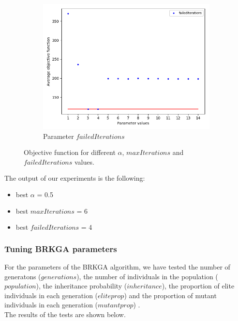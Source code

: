 \begin{figure}
\begin{subfigure}[b]{.49\linewidth}
\includegraphics[width=\linewidth]{./img/best-lsiteration.png}
\caption{Parameter $failedIterations$ }\label{fig2c}
\end{subfigure}%
\caption{Objective function for different  $\alpha$,  $maxIterations$ and   $failedIterations$ values.  }
\end{figure}


The output of our experiments is the following: 
\begin{itemize}
	\item best $\alpha$ = 0.5
	\item best $maxIterations$ = 6
	\item best $failedIterations$ = 4
\end{itemize}


\subsubsection{Tuning BRKGA parameters}

For the parameters of the BRKGA algorithm, we have tested the number of generatons ($generations$), the number of individuals in the population ($population$), the inheritance probability ($inheritance$), the proportion of elite individuals in each generation ($eliteprop$) and the proportion of mutant individuals in each generation ($mutantprop$) .\\
The results of the tests are shown below.

